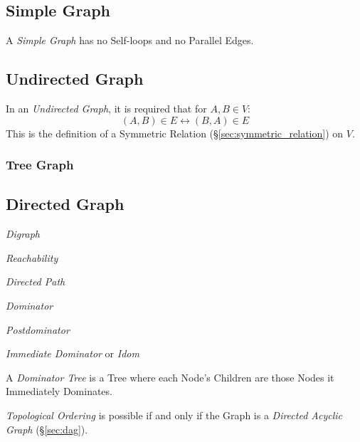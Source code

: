 \subsection{Simple Graph} \label{sec:simple_graph}

A \emph{Simple Graph} has no Self-loops and no Parallel Edges.



\subsection{Undirected Graph} \label{sec:undirected_graph}

In an \emph{Undirected Graph}, it is required that for $A,B \in V$:
\[
    (A,B) \in E \leftrightarrow (B,A) \in E
\]
This is the definition of a Symmetric Relation
(\S\ref{sec:symmetric_relation}) on $V$.



\subsubsection{Tree Graph}\label{sec:tree_graph}



\subsection{Directed Graph} \label{sec:directed_graph}

\emph{Digraph}

\emph{Reachability}

\emph{Directed Path}

\emph{Dominator}

\emph{Postdominator}

\emph{Immediate Dominator} or \emph{Idom}

A \emph{Dominator Tree} is a Tree where each Node's Children are those
Nodes it Immediately Dominates.

\emph{Topological Ordering} is possible if and only if the Graph is a
\emph{Directed Acyclic Graph} (\S\ref{sec:dag}).

